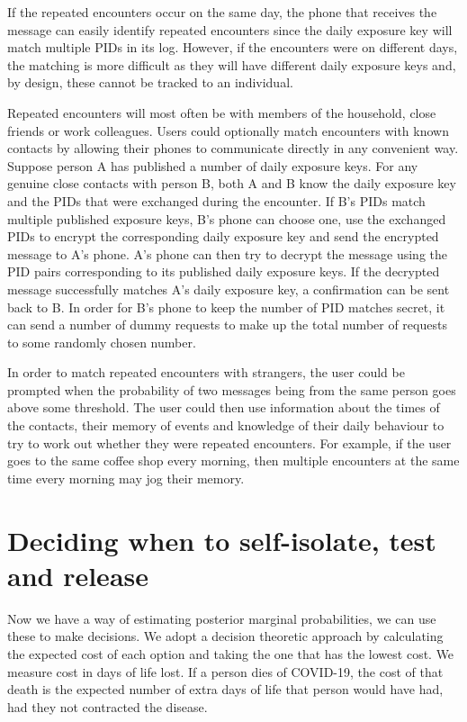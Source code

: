 \documentclass{article}
\begin{document}
If the repeated encounters occur on the same day, the phone that receives the message can easily identify repeated encounters since the daily exposure key will match multiple PIDs in its log. However, if the encounters were on different days, the matching is more difficult as they will have different daily exposure keys and, by design, these cannot be tracked to an individual.

Repeated encounters will most often be with members of the household, close friends or work colleagues. Users could optionally match encounters with known contacts by allowing their phones to communicate directly in any convenient way. Suppose person A has published a number of daily exposure keys. For any genuine close contacts with person B, both A and B know the daily exposure key and the PIDs that were exchanged during the encounter. If B's PIDs match multiple published exposure keys, B's phone can choose one, use the exchanged PIDs to encrypt the corresponding daily exposure key and send the encrypted message to A's phone. A's phone can then try to decrypt the message using the PID pairs corresponding to its published daily exposure keys. If the decrypted message successfully matches A's daily exposure key, a confirmation can be sent back to B. In order for B's phone to keep the number of PID matches secret, it can send a number of dummy requests to make up the total number of requests to some randomly chosen number.

In order to match repeated encounters with strangers, the user could be prompted when the probability of two messages being from the same person goes above some threshold. The user could then use information about the times of the contacts, their memory of events and knowledge of their daily behaviour to try to work out whether they were repeated encounters. For example, if the user goes to the same coffee shop every morning, then multiple encounters at the same time every morning may jog their memory.


\section{Deciding when to self-isolate, test and release}
Now we have a way of estimating posterior marginal probabilities, we can use these to make decisions. We adopt a decision theoretic approach by calculating the expected cost of each option and taking the one that has the lowest cost. We measure cost in days of life lost. If a person dies of COVID-19, the cost of that death is the expected number of extra days of life that person would have had, had they not contracted the disease.
\end{document}
